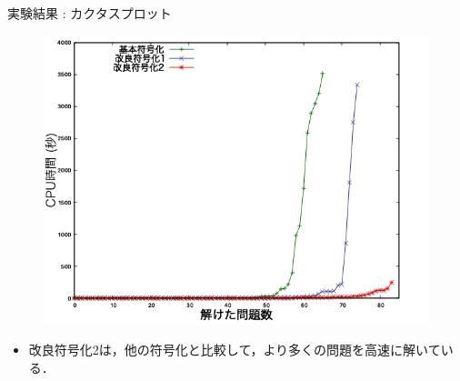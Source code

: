 \documentclass[dvipdfmx,11pt]{beamer}
\begin{document}
\begin{frame}{実験結果 : カクタスプロット}
 \begin{figure}[h]
  \centering
  \includegraphics[scale=0.4]{fig/cactus.png}
 \end{figure}
 
\begin{itemize}
 \item 改良符号化2は，他の符号化と比較して，より多くの問題を高速に解いている．
\end{itemize}\vfill
\end{frame}
 
%  

\end{document}

